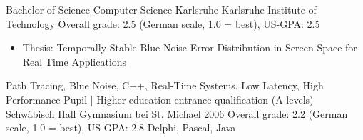 {\begin{experiences}
{    }
    {Bachelor of Science Computer Science}
    {Karlsruhe}
    {Karlsruhe Institute of Technology}
    { 
    }
    {Overall grade: 2.5 (German scale, 1.0 = best), US-GPA: 2.5}
    {
    \ifcvshowthesislines
    \begin{itemize}
        \item Thesis: Temporally Stable Blue Noise Error Distribution in Screen Space for Real Time Applications
    \end{itemize}
    \fi
    }
    {Path Tracing, Blue Noise, C++, Real-Time Systems, Low Latency, High Performance}
    \ifcvshowschool
    \emptySeparator
    {Pupil | Higher education entrance qualification (A-levels)}
    {Schwäbisch Hall}
    {Gymnasium bei St. Michael}
    {2006}
    {Overall grade: 2.2 (German scale, 1.0 = best), US-GPA: 2.8}
    {
    }
    {Delphi, Pascal, Java}
    \fi
    \end{experiences}

}{
    
}
